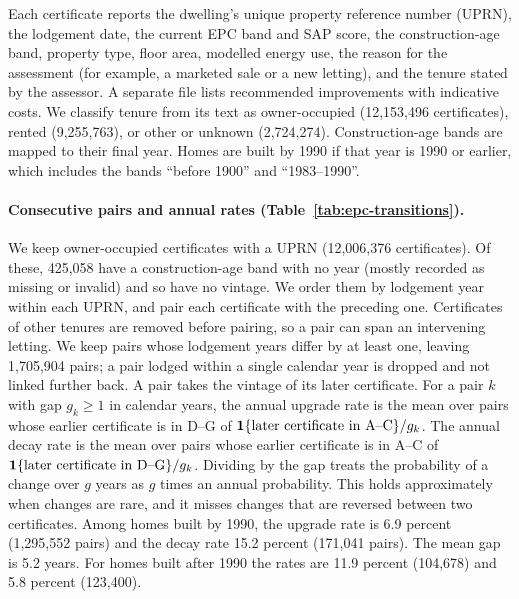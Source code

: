 Each certificate reports the dwelling's unique property reference number
(UPRN), the lodgement date, the current EPC band and SAP score, the
construction-age band, property type, floor area, modelled energy use, the
reason for the assessment (for example, a marketed sale or a new letting),
and the tenure stated by the assessor. A separate file lists recommended
improvements with indicative costs. We classify tenure from its text as
owner-occupied (12,153,496 certificates), rented (9,255,763), or
other or unknown (2,724,274). Construction-age bands are mapped to their
final year. Homes are built by 1990 if that year is 1990 or earlier, which
includes the bands ``before 1900'' and ``1983--1990''.

\paragraph{Consecutive pairs and annual rates (Table~\ref{tab:epc-transitions}).}
We keep owner-occupied certificates with a UPRN (12,006,376 certificates).
Of these, 425,058 have a construction-age band with no year (mostly
recorded as missing or invalid) and so have no vintage. We
order them by lodgement year within each UPRN, and pair each certificate
with the preceding one. Certificates of other tenures are removed before
pairing, so a pair can span an intervening letting. We keep pairs whose
lodgement years differ by at least one, leaving 1,705,904 pairs; a pair
lodged within a single calendar year is dropped and not linked further
back. A pair takes the vintage of its later certificate. For a pair $k$ with
gap $g_k\geq 1$ in calendar years, the annual upgrade rate is the mean over
pairs whose earlier certificate is in D--G of $\mathbf 1\{\text{later
certificate in A--C}\}/g_k$. The annual decay rate is the mean over pairs
whose earlier certificate is in A--C of $\mathbf 1\{\text{later certificate in
D--G}\}/g_k$. Dividing by the gap treats the probability of a change over
$g$ years as $g$ times an annual probability. This holds approximately when
changes are rare, and it misses changes that are reversed between two
certificates. Among homes built by 1990, the upgrade rate is 6.9 percent
(1,295,552 pairs) and the decay rate 15.2 percent (171,041 pairs). The
mean gap is 5.2 years. For homes built after 1990 the rates are 11.9
percent (104,678) and 5.8 percent (123,400).

